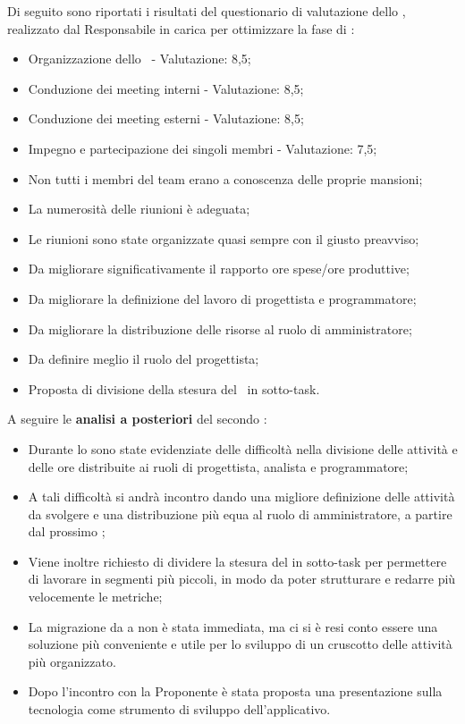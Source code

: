 \par Di seguito sono riportati i risultati del questionario di valutazione dello , realizzato dal Responsabile in carica per ottimizzare la fase di :
\begin{itemize}
  \item Organizzazione dello \ - Valutazione: 8,5;
  \item Conduzione dei meeting interni - Valutazione: 8,5;
  \item Conduzione dei meeting esterni - Valutazione: 8,5;
  \item Impegno e partecipazione dei singoli membri - Valutazione: 7,5;
  \item Non tutti i membri del team erano a conoscenza delle proprie mansioni;
  \item La numerosità delle riunioni è adeguata;
  \item Le riunioni sono state organizzate quasi sempre con il giusto preavviso;
  \item Da migliorare significativamente il rapporto ore spese/ore produttive;
  \item Da migliorare la definizione del lavoro di progettista e programmatore;
  \item Da migliorare la distribuzione delle risorse al ruolo di amministratore;
  \item Da definire meglio il ruolo del progettista;
  \item Proposta di divisione della stesura del \PdQ\ in sotto-task.
\end{itemize}

\vspace{0.5\baselineskip}
\par A seguire le \textbf{analisi a posteriori} del secondo :
\begin{itemize}
  \item Durante lo  sono state evidenziate delle difficoltà nella divisione delle attività e delle ore distribuite ai ruoli di progettista, analista e programmatore;
  \item A tali difficoltà si andrà incontro dando una migliore definizione delle attività da svolgere e una distribuzione più equa al ruolo di amministratore, a partire dal prossimo ;
  \item Viene inoltre richiesto di dividere la stesura del \PdQ in sotto-task per permettere di lavorare in segmenti più piccoli, in modo da poter strutturare e redarre più velocemente le metriche;
  \item La migrazione da  a  non è stata immediata, ma ci si è resi conto essere una soluzione più conveniente e utile per lo sviluppo di un cruscotto delle attività più organizzato.
  \item Dopo l'incontro con la Proponente è stata proposta una presentazione sulla tecnologia  come strumento di sviluppo dell'applicativo.
\end{itemize}

